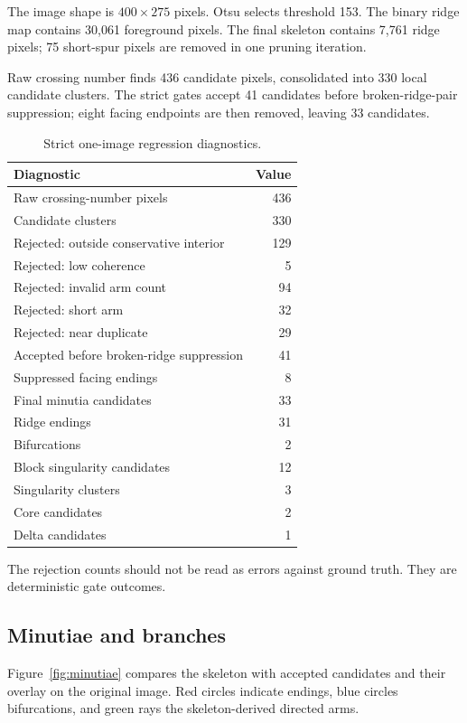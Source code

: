 \documentclass[11pt]{article}
\begin{document}
The image shape is $400\times275$ pixels. Otsu selects threshold 153. The binary ridge map contains 30,061 foreground pixels. The final skeleton contains 7,761 ridge pixels; 75 short-spur pixels are removed in one pruning iteration.

Raw crossing number finds 436 candidate pixels, consolidated into 330 local candidate clusters. The strict gates accept 41 candidates before broken-ridge-pair suppression; eight facing endpoints are then removed, leaving 33 candidates.

\begin{table}[H]
\centering
\caption{Strict one-image regression diagnostics.}
\label{tab:results}
\begin{tabular}{@{}lr@{}}
\toprule
Diagnostic & Value \\
\midrule
Raw crossing-number pixels & 436 \\
Candidate clusters & 330 \\
Rejected: outside conservative interior & 129 \\
Rejected: low coherence & 5 \\
Rejected: invalid arm count & 94 \\
Rejected: short arm & 32 \\
Rejected: near duplicate & 29 \\
Accepted before broken-ridge suppression & 41 \\
Suppressed facing endings & 8 \\
Final minutia candidates & 33 \\
Ridge endings & 31 \\
Bifurcations & 2 \\
Block singularity candidates & 12 \\
Singularity clusters & 3 \\
Core candidates & 2 \\
Delta candidates & 1 \\
\bottomrule
\end{tabular}
\end{table}

The rejection counts should not be read as errors against ground truth. They are deterministic gate outcomes.

\subsection{Minutiae and branches}

Figure~\ref{fig:minutiae} compares the skeleton with accepted candidates and their overlay on the original image. Red circles indicate endings, blue circles bifurcations, and green rays the skeleton-derived directed arms.
\end{document}
